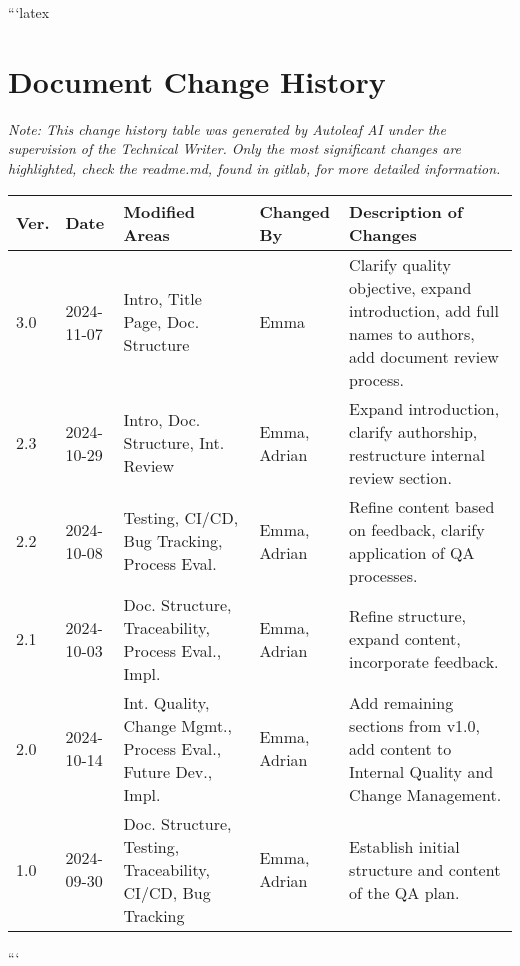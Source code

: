 ```latex
\section{Document Change History}

\begin{center}
\small\textit{Note: This change history table was generated by Autoleaf AI under the supervision of the Technical Writer. Only the most significant changes are highlighted, check the readme.md, found in gitlab, for more detailed information.}

\vspace{0.5cm}

\begin{tabular}{|p{}|p{}|p{}|p{}|p{}|}
\hline
\textbf{Ver.} & \textbf{Date} & \textbf{Modified Areas} & \textbf{Changed By} & \textbf{Description of Changes} \\
\hline
3.0 & 2024-11-07 & Intro, Title Page, Doc. Structure & Emma & Clarify quality objective, expand introduction, add full names to authors, add document review process. \\
\hline
2.3 & 2024-10-29 & Intro, Doc. Structure, Int. Review & Emma, Adrian & Expand introduction, clarify authorship, restructure internal review section. \\
\hline
2.2 & 2024-10-08 & Testing, CI/CD, Bug Tracking, Process Eval. & Emma, Adrian & Refine content based on feedback, clarify application of QA processes. \\
\hline
2.1 & 2024-10-03 & Doc. Structure, Traceability, Process Eval., Impl. & Emma, Adrian & Refine structure, expand content, incorporate feedback. \\
\hline
2.0 & 2024-10-14 & Int. Quality, Change Mgmt., Process Eval., Future Dev., Impl. & Emma, Adrian & Add remaining sections from v1.0, add content to Internal Quality and Change Management. \\
\hline
1.0 & 2024-09-30 & Doc. Structure, Testing, Traceability, CI/CD, Bug Tracking & Emma, Adrian & Establish initial structure and content of the QA plan. \\
\hline
\end{tabular}
\end{center}

\vspace{1cm}
```
